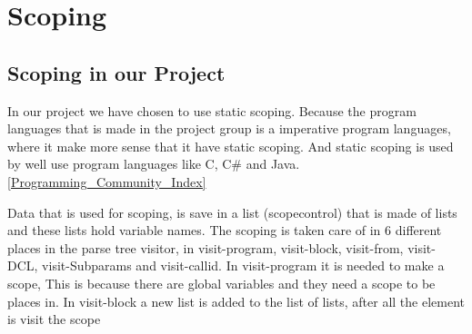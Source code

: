 \section{Scoping}
%
%



\subsection{Scoping in our Project}
In our project we have chosen to use static scoping. Because the program languages that is made in the project group is a imperative program languages, where it make more sense that it have static scoping. And static scoping is used by well use program languages like C, C# and Java. \ref{Programming_Community_Index}

Data that is used for scoping, is save in a list (scopecontrol) that is made of lists and these lists hold variable names. The scoping is taken care of in 6 different places in the parse tree visitor, in visit-program, visit-block, visit-from, visit-DCL, visit-Subparams and visit-callid. In visit-program it is needed to make a scope, This is because there are global variables and they need a scope to be places in. In visit-block a new list is added to the list of lists, after all the element is visit the scope 


